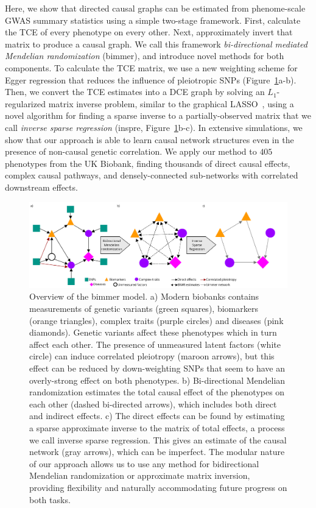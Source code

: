 \documentclass{article}
\begin{document}
Here, we show that directed causal graphs can be estimated from phenome-scale GWAS summary
statistics using a simple two-stage framework. First, calculate the TCE of every phenotype
on every other. Next, approximately invert that matrix to produce a causal graph.
We call this framework \emph{bi-directional mediated Mendelian randomization} (bimmer),
and introduce novel methods for both components. To calculate the TCE matrix, we
use a new weighting scheme for Egger regression that reduces the
influence of pleiotropic SNPs (Figure~\ref{figure0}a-b). Then, we convert the TCE
estimates into a DCE graph by solving an $L_1$-regularized matrix inverse problem,
similar to the graphical LASSO~\cite{Friedman2007}, using a novel
algorithm for finding a sparse inverse to a partially-observed matrix that we call
\emph{inverse sparse regression} (inspre, Figure~\ref{figure0}b-c).
In extensive simulations, we show that our approach is able to learn causal
 network structures even in the presence of non-causal genetic correlation.
We apply our method to $405$ phenotypes from the UK Biobank, finding thousands
 of direct causal effects, complex causal pathways, and densely-connected sub-networks
 with correlated downstream effects. 
 
\begin{figure}
\includegraphics[width=\textwidth]{figures/bimmer_fig1.pdf}
\caption{Overview of the bimmer model. a) Modern biobanks contains measurements
of genetic variants (green squares), biomarkers
(orange triangles), complex traits (purple circles) and diseases (pink diamonds). Genetic variants
affect these phenotypes which in turn affect each other. The presence of unmeasured latent factors
(white circle)
can induce correlated pleiotropy (maroon arrows), but this effect can be reduced by down-weighting
SNPs that seem to have an overly-strong effect on both phenotypes. b) Bi-directional Mendelian randomization
estimates the total causal effect of the phenotypes on each other (dashed bi-directed arrows),
which includes both direct and indirect effects. c) The direct effects can be
found by estimating a sparse approximate inverse to the matrix of total effects, a process we
call inverse sparse regression. This gives an estimate of the causal network (gray arrows), which
can be imperfect. The modular nature of our approach allows us to use any method for bidirectional
Mendelian randomization or approximate matrix inversion, providing flexibility
and naturally accommodating future progress on both tasks.}
\label{figure0}
\end{figure}
\end{document}
